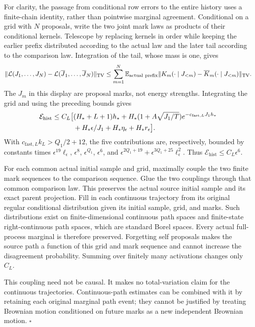 For clarity, the passage from conditional row errors to the entire
history uses a finite-chain identity, rather than pointwise marginal
agreement. Conditional on a grid with $N$ proposals, write the two
joint mark laws as products of their conditional kernels.
Telescope by replacing kernels in order while keeping the earlier
prefix distributed according to the actual law and the later tail
according to the comparison law. Integration of the tail, whose
mass is one, gives
\begin{equation}
 \|\mathcal L(J_1,\ldots,J_N)
          -\mathcal L(\overline J_1,\ldots,\overline J_N)\|_{\mathrm{TV}}
 \le \sum_{m=1}^N
       \mathbb E_{\mathrm{actual\ prefix}}
       \|K_m(\cdot\mid J_{<m})
                 -\overline K_m(\cdot\mid J_{<m})\|_{\mathrm{TV}}.
 \label{eq:rg-formation-history-telescoping}
\end{equation}
The $J_m$ in this display are proposal marks, not energy strengths.
Integrating the grid and using the preceding bounds gives
\begin{align}
 \mathcal E_{\mathrm{hist}}\le C_L\big[
 &(H_*+L+1)h_*
 +H_*(1+A\sqrt{J_1/T})
                      e^{-c_{\mathrm{fast},L}J_1h_*}
 \notag\\
 &+H_*\epsilon/J_1
       +H_*\eta_\epsilon+H_*r_\epsilon\big].
 \label{eq:rg-formation-full-history-error}
\end{align}
With $c_{\mathrm{fast},L}k_L>Q_1/2+12$, the five contributions
are, respectively, bounded by constants times
$\epsilon^{19}\ell_\epsilon$, $\epsilon^8$,
$\epsilon^{Q_1}$, $\epsilon^6$, and
$\epsilon^{2Q_1+19}+\epsilon^{3Q_1+25}\ell_\epsilon^2$.
Thus $\mathcal E_{\mathrm{hist}}\le C_L\epsilon^6$.

For each common actual initial sample and grid, maximally couple
the two finite mark sequences to the comparison sequence.
Glue the two couplings through that common comparison law. This
preserves the actual source initial sample and its exact parent
projection. Fill in each continuous trajectory from its original
regular conditional distribution given its initial sample, grid,
and marks. Such distributions exist on finite-dimensional continuous
path spaces and finite-state right-continuous path spaces, which
are standard Borel spaces. Every actual full-process marginal is
therefore preserved. Forgetting self proposals makes the source
path a function of this grid and mark sequence and cannot increase
the disagreement probability. Summing over finitely many
activations changes only $C_L$.

This coupling need not be causal. It makes no total-variation claim
for the continuous trajectories. Continuous-path estimates can be
combined with it by retaining each original marginal path event;
they cannot be justified by treating Brownian motion conditioned on
future marks as a new independent Brownian motion.
\hfill$\square$

